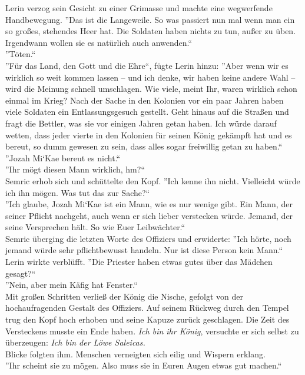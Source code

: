 Lerin verzog sein Gesicht zu einer Grimasse und machte eine wegwerfende Handbewegung. ''Das ist die 
Langeweile. So was passiert nun mal wenn man ein so großes, stehendes Heer hat. Die Soldaten haben 
nichts zu tun, außer zu üben. Irgendwann wollen sie es natürlich auch anwenden.``\\
''Töten.``\\
''Für das Land, den Gott und die Ehre``, fügte Lerin hinzu: ''Aber wenn wir es wirklich so weit 
kommen 
lassen – und ich denke, wir haben keine andere Wahl – wird die Meinung schnell umschlagen. Wie 
viele, meint Ihr, waren wirklich schon einmal im Krieg? Nach der Sache in den Kolonien vor ein paar 
Jahren haben viele Soldaten ein Entlassungsgesuch gestellt. Geht hinaus auf die Straßen und fragt 
die Bettler, was sie vor einigen Jahren getan haben. Ich würde darauf wetten, dass jeder vierte in 
den Kolonien für seinen König gekämpft hat und es bereut, so dumm gewesen zu sein, dass alles sogar 
freiwillig getan zu haben.``\\
''Jozah Mi‘Kae bereut es nicht.``\\
''Ihr mögt diesen Mann wirklich, hm?``\\
Semric erhob sich und schüttelte den Kopf. ''Ich kenne ihn nicht. Vielleicht würde ich ihn mögen. 
Was 
tut das zur Sache?``\\
''Ich glaube, Jozah Mi‘Kae ist ein Mann, wie es nur wenige gibt. Ein Mann, der seiner Pflicht 
nachgeht, auch wenn er sich lieber verstecken würde. Jemand, der seine Versprechen hält. So wie 
Euer 
Leibwächter.``\\
Semric überging die letzten Worte des Offiziers und erwiderte: ''Ich hörte, noch jemand würde sehr 
pflichtbewusst handeln. Nur ist diese Person kein Mann.``\\
Lerin wirkte verblüfft. ''Die Priester haben etwas gutes über das Mädchen gesagt?``\\
''Nein, aber mein Käfig hat Fenster.``\\
Mit großen Schritten verließ der König die Nische, gefolgt von der hochaufragenden Gestalt 
des Offiziers. Auf seinem Rückweg durch den Tempel trug den Kopf hoch erhoben und seine 
Kapuze zurück geschlagen. Die Zeit des Versteckens musste ein Ende haben. \textit{Ich bin ihr 
König}, versuchte er sich selbst zu überzeugen: \textit{Ich bin der Löwe Saleicas.}\\
Blicke folgten ihm. Menschen verneigten sich eilig und Wispern erklang.\\
''Ihr scheint sie zu mögen. Also muss sie in Euren Augen etwas gut machen.``
